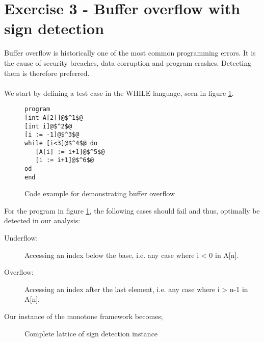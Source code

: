 \section{Exercise 3 - Buffer overflow with sign detection} \label{sec:exercise3}
Buffer overflow is historically one of the most common programming errors. It is the cause of security breaches, data corruption and program crashes. Detecting them is therefore preferred.\\\\
We start by defining a test case in the WHILE language, seen in figure \ref{code:array_example}.
\begin{figure}
  \begin{lstlisting}
program
[int A[2]]@$^1$@
[int i]@$^2$@
[i := -1]@$^3$@
while [i<3]@$^4$@ do
   [A[i] := i+1]@$^5$@
   [i := i+1]@$^6$@
od
end
 \end{lstlisting}
 \label{code:array_example}
 \caption{Code example for demonstrating buffer overflow}
\end{figure}
For the program in figure \ref{code:array_example}, the following cases should fail and thus, optimally be detected in our analysis:
\begin{description}
\item[Underflow:] Accessing an index below the base, i.e. any case where i < 0 in A[n].
\item[Overflow:] Accessing an index after the last element, i.e. any case where i > n-1 in A[n].
\end{description}

Our instance of the monotone framework becomes; 
 \begin{figure}[h]
 \centering
  \caption{Complete lattice of sign detection instance}
 
  \label{fig:sign_detection_complete_lattice}
 \end{figure}

